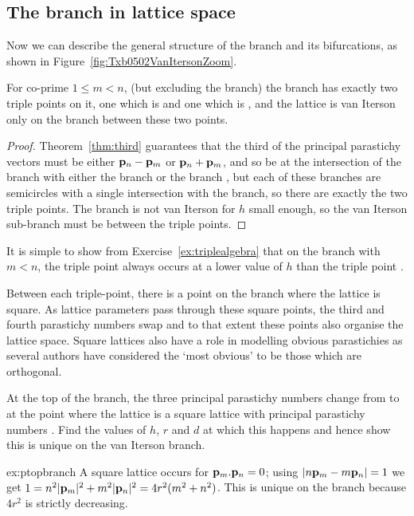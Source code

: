 \subsection{The  branch in lattice space}
Now we can describe the general structure of the  branch and its bifurcations, as shown in Figure~\ref{fig:Txb0502VanItersonZoom}.
\begin{theorem}
	For co-prime $1\leq m<n$,  (but excluding the  branch) the  branch has exactly two triple points on it, one which is  and one which is ,  and the lattice is van Iterson only on the branch between these two points.
\end{theorem}
\begin{proof}
	Theorem~\ref{thm:third} guarantees that the third of the principal parastichy vectors must be either ${\mathbf p}_{n}-{\mathbf p}_{m}$  or  ${\mathbf p}_{n}+{\mathbf p}_{m}$, 
	and so be at the intersection of the branch with either the branch   or the branch  , but each of these branches are semicircles with a single intersection with the  branch, so there are exactly the two triple points.  The  branch is not van Iterson for $h$ small enough, so the van Iterson sub-branch must be between the triple points. 
\end{proof}
It is simple to show from Exercise~\ref{ex:triplealgebra} that on the   branch with $m<n$, the triple point  always occurs at a lower value of $h$ than the triple point . 


Between each triple-point, there is a point on the branch where the lattice is square. 
As lattice parameters pass through these square points, the third and fourth parastichy numbers swap and to that extent these points also organise the lattice space. 
Square lattices also have a role in modelling obvious parastichies as several authors have considered the `most obvious' to be those which are orthogonal. 
\begin{jExercise}\label{ex:ptopbranch}
	At the top of the  branch, the three principal parastichy numbers change from  to  at the point where the lattice is a square lattice with principal parastichy numbers . Find the values of $h$, $r$ and $d$ at which this happens and hence show this is unique on the van Iterson branch.
\end{jExercise}
\begin{jAnswer}{ex:ptopbranch}{
	A square lattice occurs for ${\mathbf p}_{m}.{\mathbf p}_{n}=0$; using $|n{\mathbf p}_{m}-m{\mathbf p}_{n}|=1$ we get
	$1=n^2|{\mathbf p}_{m}|^2+m^2|{\mathbf p}_{n}|^2= 4 r^2 ( m^2+n^2)$. This is unique on the branch because  $4r^2$ is strictly decreasing.
}\end{jAnswer}


